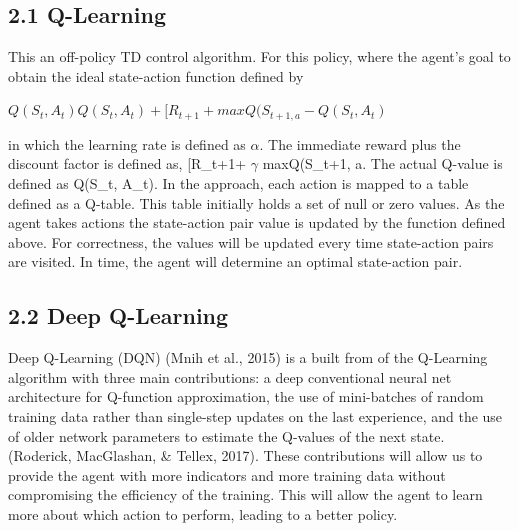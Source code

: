 \documentclass[letterpaper]{article}
\begin{document}
\subsection{2.1 Q-Learning}
This an off-policy TD control algorithm. For this policy, where the agent's goal to obtain the ideal state-action function defined by

$Q(S_{t}, A_{t}) $\leftarrow$ Q(S_{t}, A_{t})+ $\alpha$ [R_{t+1}+ $\gamma$ maxQ(S_{t+1, a}-Q(S_{t}, A_{t})$


in which the learning rate is defined as $\alpha$. The immediate reward plus the discount factor is defined as, [R_{t+1}+ $\gamma$ maxQ(S_{t+1, a}. The actual Q-value is defined as Q(S_{t}, A_{t}).
In the approach, each action is mapped to a table defined as a Q-table. This table initially holds a set of null or zero values. As the agent takes actions the state-action pair value is updated by the function defined above. For correctness, the values will be updated every time state-action pairs are visited. In time, the agent will determine an optimal state-action pair.

\subsection{2.2 Deep Q-Learning} 
Deep Q-Learning (DQN) (Mnih et al., 2015) is a built from of the Q-Learning algorithm with three main contributions: a deep conventional neural net architecture for Q-function approximation,
the use of mini-batches of random training data rather than single-step updates on the last experience, and the use of older network parameters to estimate the Q-values of the next state. (Roderick, MacGlashan, \& Tellex, 2017). These contributions will allow us to provide the agent with more indicators and more training data without compromising the efficiency of the training. This will allow the agent to learn more about which action to perform, leading to a better policy.
\end{document}
